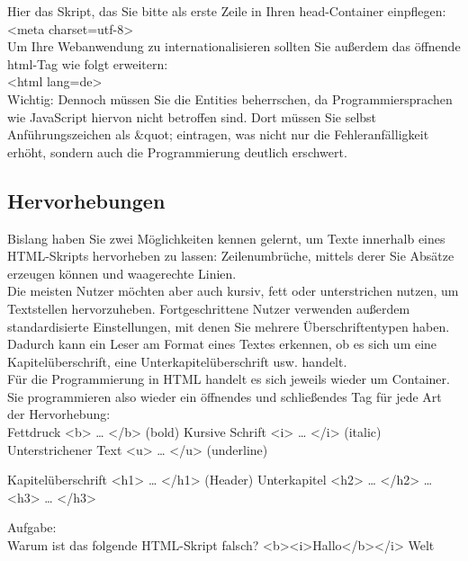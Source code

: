 Hier das Skript, das Sie bitte als erste Zeile in Ihren head-Container einpflegen:\\

<meta charset=utf-8>\\

Um Ihre Webanwendung zu internationalisieren sollten Sie außerdem das öffnende html-Tag wie folgt erweitern:\\

<html lang=de>\\

Wichtig: Dennoch müssen Sie die Entities beherrschen, da Programmiersprachen wie JavaScript hiervon nicht betroffen sind. Dort müssen Sie selbst Anführungszeichen als \&quot; eintragen, was nicht nur die Fehleranfälligkeit erhöht, sondern auch die Programmierung deutlich erschwert.\\

\subsection{Hervorhebungen}

Bislang haben Sie zwei Möglichkeiten kennen gelernt, um Texte innerhalb eines HTML-Skripts hervorheben zu lassen: Zeilenumbrüche, mittels derer Sie Absätze erzeugen können und waagerechte Linien.\\

Die meisten Nutzer möchten aber auch kursiv, fett oder unterstrichen nutzen, um Textstellen hervorzuheben. Fortgeschrittene Nutzer verwenden außerdem standardisierte Einstellungen, mit denen Sie mehrere Überschriftentypen haben. Dadurch kann ein Leser am Format eines Textes erkennen, ob es sich um eine Kapitelüberschrift, eine Unterkapitelüberschrift usw. handelt.\\

Für die Programmierung in HTML handelt es sich jeweils wieder um Container. Sie programmieren also wieder ein öffnendes und schließendes Tag für jede Art der Hervorhebung:\\

Fettdruck	<b> … </b>	(bold)
Kursive Schrift	<i> … </i>	(italic)
Unterstrichener Text	<u> … </u>	(underline)

Kapitelüberschrift	<h1> … </h1>	(Header)
Unterkapitel	<h2> … </h2>	
…	<h3> … </h3>	

Aufgabe: \\

Warum ist das folgende HTML-Skript falsch? <b><i>Hallo</b></i> Welt\\

